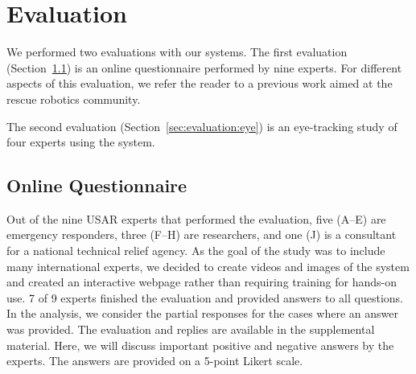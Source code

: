 \documentclass{egpubl}
\begin{document}
\section{Evaluation} \label{sec:evaluation}
We performed two evaluations with our systems. The first evaluation (Section~\ref{sec:evaluation:question}) is an online questionnaire performed by nine experts. For different aspects of this evaluation, we refer the reader to a previous work aimed at the rescue robotics community\cite{BKLR14a}.

The second evaluation (Section~\ref{sec:evaluation:eye}) is an eye-tracking study of four experts using the system.

\subsection{Online Questionnaire} \label{sec:evaluation:question}
Out of the nine USAR experts that performed the evaluation, five (A--E) are emergency responders, three (F--H) are researchers, and one (J) is a consultant for a national technical relief agency. As the goal of the study was to include many international experts, we decided to create videos and images of the system and created an interactive webpage rather than requiring training for hands-on use. 7 of 9 experts finished the evaluation and provided answers to all questions. In the analysis, we consider the partial responses for the cases where an answer was provided. The evaluation and replies are available in the supplemental material. Here, we will discuss important positive and negative answers by the experts. The answers are provided on a 5-point Likert scale.
\end{document}
